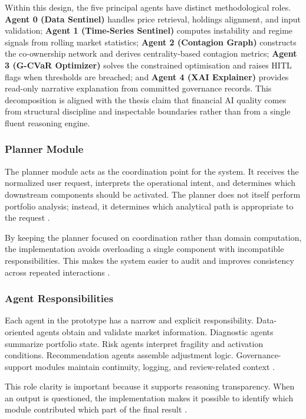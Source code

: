 \documentclass[11pt]{article}
\begin{document}
Within this design, the five principal agents have distinct methodological roles. \textbf{Agent 0 (Data Sentinel)} handles price retrieval, holdings alignment, and input validation; \textbf{Agent 1 (Time-Series Sentinel)} computes instability and regime signals from rolling market statistics; \textbf{Agent 2 (Contagion Graph)} constructs the co-ownership network and derives centrality-based contagion metrics; \textbf{Agent 3 (G-CVaR Optimizer)} solves the constrained optimisation and raises HITL flags when thresholds are breached; and \textbf{Agent 4 (XAI Explainer)} provides read-only narrative explanation from committed governance records. This decomposition is aligned with the thesis claim that financial AI quality comes from structural discipline and inspectable boundaries rather than from a single fluent reasoning engine.

\subsubsection{Planner Module}
The planner module acts as the coordination point for the system. It receives the normalized user request, interprets the operational intent, and determines which downstream components should be activated. The planner does not itself perform portfolio analysis; instead, it determines which analytical path is appropriate to the request \cite{wooldridge2009,li2023}.

By keeping the planner focused on coordination rather than domain computation, the implementation avoids overloading a single component with incompatible responsibilities. This makes the system easier to audit and improves consistency across repeated interactions \cite{hayesroth1985,ji2023}.

\subsubsection{Agent Responsibilities}
Each agent in the prototype has a narrow and explicit responsibility. Data-oriented agents obtain and validate market information. Diagnostic agents summarize portfolio state. Risk agents interpret fragility and activation conditions. Recommendation agents assemble adjustment logic. Governance-support modules maintain continuity, logging, and review-related context \cite{jennings1998,hamilton2017}.

This role clarity is important because it supports reasoning transparency. When an output is questioned, the implementation makes it possible to identify which module contributed which part of the final result \cite{adadi2018,mifid2014}.
\end{document}
